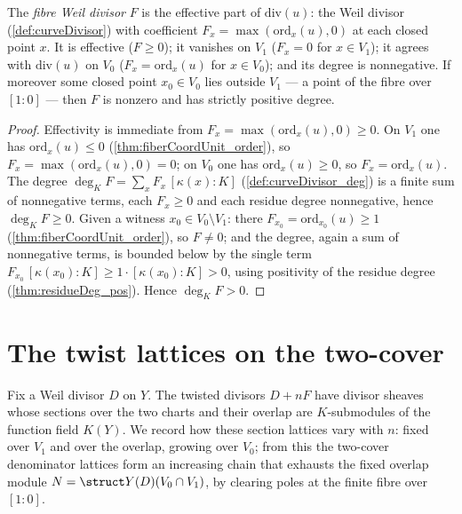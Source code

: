 \begin{definition}
  \label{def:fiberWeilDivisor}
  \leanok
  The \emph{fibre Weil divisor} \(F\) is the effective part of \(\mathrm{div}(u)\): the Weil divisor
  (\ref{def:curveDivisor}) with coefficient \(F_x = \max(\mathrm{ord}_x(u), 0)\) at each closed point
  \(x\). It is effective (\(F \ge 0\)); it vanishes on \(V_1\) (\(F_x = 0\) for \(x \in V_1\)); it
  agrees with \(\mathrm{div}(u)\) on \(V_0\) (\(F_x = \mathrm{ord}_x(u)\) for \(x \in V_0\)); and its
  degree is nonnegative. If moreover some closed point \(x_0 \in V_0\) lies outside \(V_1\) --- a
  point of the fibre over \([1 : 0]\) --- then \(F\) is nonzero and has strictly positive degree.
\end{definition}
\begin{proof}
  \leanok
  Effectivity is immediate from \(F_x = \max(\mathrm{ord}_x(u), 0) \ge 0\). On \(V_1\) one has
  \(\mathrm{ord}_x(u) \le 0\) (\ref{thm:fiberCoordUnit_order}), so \(F_x = \max(\mathrm{ord}_x(u), 0)
  = 0\); on \(V_0\) one has \(\mathrm{ord}_x(u) \ge 0\), so \(F_x = \mathrm{ord}_x(u)\). The degree
  \(\deg_K F = \sum_x F_x\,[\kappa(x):K]\) (\ref{def:curveDivisor_deg}) is a finite sum of
  nonnegative terms, each \(F_x \ge 0\) and each residue degree nonnegative, hence \(\deg_K F \ge 0\).
  Given a witness \(x_0 \in V_0 \setminus V_1\): there \(F_{x_0} = \mathrm{ord}_{x_0}(u) \ge 1\)
  (\ref{thm:fiberCoordUnit_order}), so \(F \ne 0\); and the degree, again a sum of nonnegative terms,
  is bounded below by the single term \(F_{x_0}\,[\kappa(x_0):K] \ge 1\cdot[\kappa(x_0):K] > 0\),
  using positivity of the residue degree (\ref{thm:residueDeg_pos}). Hence \(\deg_K F > 0\).
\end{proof}

\section{The twist lattices on the two-cover}

Fix a Weil divisor \(D\) on \(Y\). The twisted divisors \(D + nF\) have divisor sheaves whose
sections over the two charts and their overlap are \(K\)-submodules of the function field \(K(Y)\).
We record how these section lattices vary with \(n\): fixed over \(V_1\) and over the overlap,
growing over \(V_0\); from this the two-cover denominator lattices form an increasing chain that
exhausts the fixed overlap module \(N = \struct Y(D)(V_0 \cap V_1)\), by clearing poles at the
finite fibre over \([1 : 0]\).

